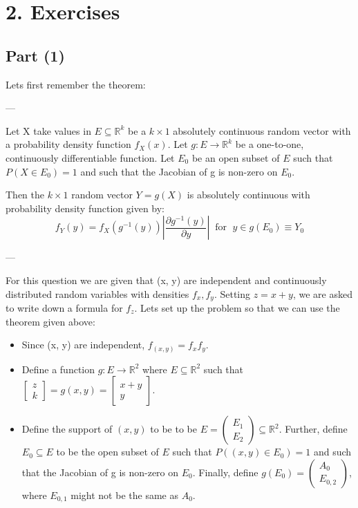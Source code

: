 \documentclass[10pt]{report}
\newcommand{\Reals}{\mathbb{R}}
\begin{document}
\maketitle

\section*{2. Exercises}
\subsection*{Part (1)}
Lets first remember the theorem:


\noindent ---
\begin{theorem}
    Let X take values in $E \subseteq \Reals^k$ be a $k \times 1$ absolutely continuous random vector with a probability density function $f_X(x)$. Let $g: E \rightarrow\Reals^k$ be a one-to-one, continuously differentiable function. Let $E_0$ be an open subset of $E$ such that $P(X \in E_0)=1$ and such that the Jacobian of g is non-zero on $E_0$.

    Then the $k \times 1$ random vector $Y=g(X)$ is absolutely continuous with probability density function given by:
    \[f_Y(y) = f_X(g^{-1}(y)) |\frac{\partial g^{-1}(y)}{\partial y}| \; \; \text{for } \; y \in g(E_0)\equiv Y_0\]
\end{theorem}
---
\;


For this question we are given that (x, y) are independent and continuously distributed random variables with densities $f_x, f_y$. Setting $z = x +y$, we are asked to write down a formula for $f_z$. Lets set up the problem so that we can use the theorem given above:

\begin{itemize}
    \item Since (x, y) are independent, $f_{(x, y)} = f_x f_y$.
    \item Define a function $g:E \rightarrow \Reals^2$ where $E \subseteq \Reals^2$ such that $ \begin{bmatrix}
        z\\
        k    
        \end{bmatrix} = g(x,y) = \begin{bmatrix}
    x + y\\
    y    
    \end{bmatrix}$. 
    \item Define the support of $(x, y)$ to be to be $E = \begin{pmatrix} E_1 \\ E_2 \end{pmatrix} \subseteq \Reals^2$. Further, define $E_0 \subseteq E$ to be the open subset of $E$  such that $P((x, y) \in E_0)=1$ and such that the Jacobian of g is non-zero on $E_0$. Finally, define $g(E_0) = \begin{pmatrix} A_0 \\ E_{0,2} \end{pmatrix}$, where $E_{0,1}$ might not be the same as $A_0$.
\end{itemize}
\end{document}
